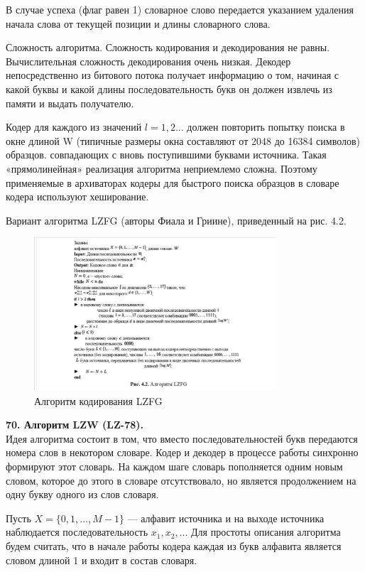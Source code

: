 \documentclass[14pt]{article}
\begin{document}
В случае успеха (флаг равен 1) словарное слово передается указанием удаления начала слова от текущей позиции и длины словарного слова.

Сложность алгоритма. Сложность кодирования и декодирования не равны. Вычислительная сложность декодирования очень низкая. Декодер непосредственно из битового потока получает информацию о том, начиная с какой буквы и какой длины последовательность букв он должен извлечь из памяти и выдать получателю.

Кодер для каждого из значений \(l = 1, 2...\) должен повторить попытку поиска в окне длиной W (типичные размеры окна составляют от 2048 до 16384 символов) образцов. совпадающих с вновь поступившими буквами источника. Такая «прямолинейная» реализация алгоритма неприемлемо сложна. Поэтому применяемые в архиваторах кодеры для быстрого поиска образцов в словаре кодера используют хеширование.

Вариант алгоритма LZFG (авторы Фиала и Гриине), приведенный на рис. 4.2.

\begin{figure}[h!]
\centering
    \includegraphics[width=90mm]{lzfg_alg.png}
\caption{Алгоритм кодирования LZFG}
\end{figure}

\bigskip
\textbf{70. Алгоритм LZW (LZ-78).} \\

Идея алгоритма состоит в том, что вместо последовательностей букв передаются номера слов в некотором словаре. Кодер и декодер в процессе работы синхронно формируют этот словарь. На каждом шаге словарь пополняется одним новым словом, которое до этого в словаре отсутствовало, но является продолжением на одну букву одного из слов словаря.

Пусть \(X = \{0,1,...,M-1\}\) — алфавит источника и на выходе источника наблюдается последовательность \(x_1, x_2, ...\) Для простоты описания алгоритма будем считать, что в начале работы кодера каждая из букв алфавита является словом длиной 1 и входит в состав словаря.
\end{document}
